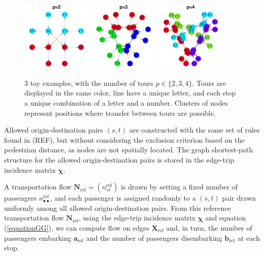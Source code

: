 \documentclass{bmcart}
\begin{document}
\begin{figure}
	\includegraphics[width=0.3\textwidth]{fig/toy_2_display.pdf}
	\includegraphics[width=0.3\textwidth]{fig/toy_3_display.pdf}
	\includegraphics[width=0.3\textwidth]{fig/toy_4_display.pdf}
	\caption{3 toy examples, with the number of tours $p \in \{2,3,4\}$. Tours are displayed in the same color, line have a unique letter, and each stop a unique combination of a letter and a number. Clusters of nodes represent positions where transfer between tours are possible.}
	\label{toy_example_plots}
\end{figure}

Allowed origin-destination pairs $(s,t)$ are constructed with the same set of rules found in (REF), but without considering the exclusion criterion based on the pedestrian distance, as nodes are not spatially located. The graph shortest-path structure for the allowed origin-destination pairs is stored in the edge-trip incidence matrix $\bm{\chi}$.

A transportation flow $\mathbf{N}_\text{ref} = (n^\text{ref}_{st})$ is drawn by setting a fixed number of passengers $n^\text{ref}_{\bullet \bullet}$, and each passenger is assigned randomly to a $(s, t)$ pair drawn uniformly among all allowed origin-destination pairs. From this reference transportation flow $\mathbf{N}_\text{ref}$, using the edge-trip incidence matrix $\bm{\chi}$ and equation (\ref{equationGG}), we can compute flow on edges $\mathbf{X}_\text{ref}$ and, in turn, the number of passengers embarking $\mathbf{a}_\text{ref}$ and the number of passengers disembarking $\mathbf{b}_\text{ref}$ at each stop.
\end{document}
